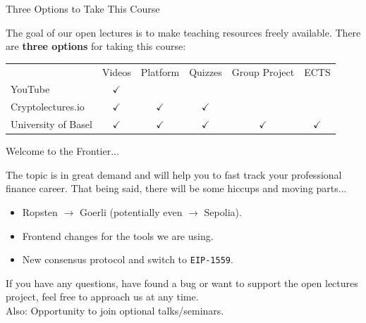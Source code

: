 \documentclass[handout]{beamer}
\begin{document}
\begin{frame}{Three Options to Take This Course}

The goal of our open lectures is to make teaching resources freely available. There are \color{focus} \textbf{three options} \color{black} for taking this course:\vspace{1em}

\begin{table}\footnotesize
	\begin{tabular}{lccccc}
	\hline \hline
									& Videos 		& Platform 		& Quizzes  		& Group Project	& ECTS 			\\ \cline{2-6}
		YouTube 	 				& $\checkmark$	& 				& 				& 				&				\\
		Cryptolectures.io 			& $\checkmark$	& $\checkmark$	& $\checkmark$	&				&				\\
		University of Basel			& $\checkmark$	& $\checkmark$	& $\checkmark$	& $\checkmark$	&$\checkmark$	\\
		\hline \hline
	\end{tabular}
\end{table} \vspace{2em}


\end{frame}

\begin{frame}{Welcome to the Frontier...}

The topic is in great demand and will help you to fast track your professional finance career. That being said, there will be \color{focus} some hiccups and moving parts... \color{black} \vspace{1em} 
	\begin{itemize}
		\item Ropsten $\rightarrow$ Goerli (potentially even $\rightarrow$ Sepolia).
		\item Frontend changes for the tools we are using. 
		\item New consensus protocol and switch to \texttt{EIP-1559}.
	\end{itemize}	
	
	\vspace{2em}
	
If you have any questions, have found a bug or want to support the open lectures project, feel free to approach us at any time. \\

\vspace{1em}
Also: Opportunity to join optional talks/seminars.
	
\end{frame}
\end{document}

